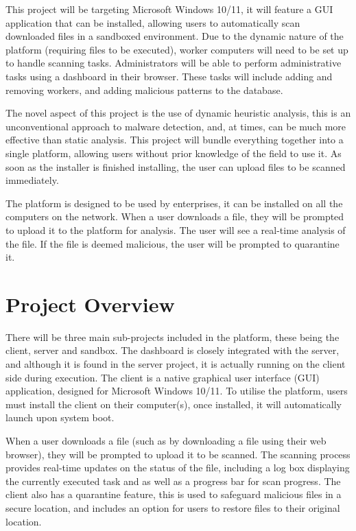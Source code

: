 This project will be targeting Microsoft Windows 10/11,
it will feature a GUI application that can be installed,
allowing users to automatically scan downloaded files in a sandboxed environment.
Due to the dynamic nature of the platform (requiring files to be executed),
worker computers will need to be set up to handle scanning tasks.
Administrators will be able to perform administrative
tasks using a dashboard in their browser.
These tasks will include adding and removing workers,
and adding malicious patterns to the database.

The novel aspect of this project is the use of dynamic heuristic analysis,
this is an unconventional approach to malware detection,
and, at times, can be much more effective than static analysis.
This project will bundle everything together into a single platform,
allowing users without prior knowledge of the field to use it.
As soon as the installer is finished installing,
the user can upload files to be scanned immediately.

The platform is designed to be used by enterprises,
it can be installed on all the computers on the network.
When a user downloads a file, they will be prompted to
upload it to the platform for analysis.
The user will see a real-time analysis of the file.
If the file is deemed malicious, the user will be prompted to quarantine it.

\section{Project Overview}
There will be three main sub-projects included in the platform,
these being the client, server and sandbox.
The dashboard is closely integrated with the server,
and although it is found in the server project,
it is actually running on the client side during execution.
The client is a native graphical user interface (GUI) application,
designed for Microsoft Windows 10/11.
To utilise the platform, users must install the client on their computer(s),
once installed, it will automatically launch upon system boot.

When a user downloads a file
(such as by downloading a file using their web browser),
they will be prompted to upload it to be scanned.
The scanning process provides real-time updates on the status of the file,
including a log box displaying the currently executed task
and as well as a progress bar for scan progress.
The client also has a quarantine feature,
this is used to safeguard malicious files in a secure location,
and includes an option for users to restore files to their original location.

